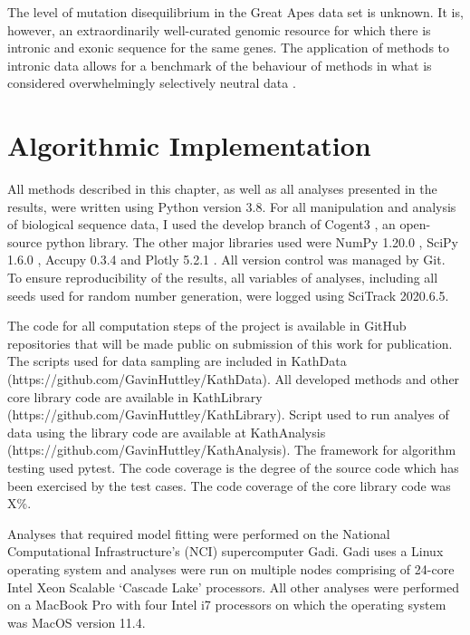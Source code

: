 The level of mutation disequilibrium in the Great Apes data set is unknown. It is, however, an extraordinarily well-curated genomic resource for which there is intronic and exonic sequence for the same genes. The application of methods to intronic data allows for a benchmark of the behaviour of methods in what is considered overwhelmingly selectively neutral data \citep{Graur2013OnENCODE}. 

\section{Algorithmic Implementation}

All methods described in this chapter, as well as all analyses presented in the results, were written using Python version 3.8. For all manipulation and analysis of biological sequence data, I used the develop branch of Cogent3 \citep{huttley_gavin_2021_4542532}, an open-source python library. The other major libraries used were NumPy 1.20.0 \citep{VanDerWalt2011TheComputation}, SciPy 1.6.0 \citep{SciPy2001}, Accupy 0.3.4 \citep{accupy} and Plotly 5.2.1 \citep{plotly}. All version control was managed by Git. To ensure reproducibility of the results, all variables of analyses, including all seeds used for random number generation, were logged using SciTrack 2020.6.5.

The code for all computation steps of the project is available in GitHub repositories that will be made public on submission of this work for publication. The scripts used for data sampling are included in KathData (https://github.com/GavinHuttley/KathData). All developed methods and other core library code are available in KathLibrary (https://github.com/GavinHuttley/KathLibrary). Script used to run analyes of data using the library code are available at KathAnalysis (https://github.com/GavinHuttley/KathAnalysis). The framework for algorithm testing used pytest. The code coverage is the degree of the source code which has been exercised by the test cases. The code coverage of the core library code was X\%. 

Analyses that required model fitting were performed on the National Computational Infrastructure's (NCI) supercomputer Gadi. Gadi uses a Linux operating system and analyses were run on multiple nodes comprising of 24-core Intel Xeon Scalable `Cascade Lake’ processors. All other analyses were performed on a MacBook Pro with four Intel i7 processors on which the  operating system was MacOS version 11.4. 